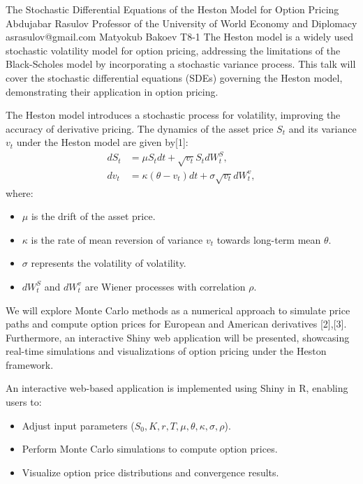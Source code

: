 \begin{talk}
  {The Stochastic Differential Equations of the Heston Model for Option Pricing}%
  {Abdujabar Rasulov}%
  {Professor of the University of World Economy and Diplomacy}%
  {asrasulov@gmail.com}%
  {Matyokub Bakoev}%
  {T8-1}%
The Heston model is a widely used stochastic volatility model for option pricing, addressing the limitations of the Black-Scholes model by incorporating a stochastic variance process. This talk will cover the stochastic differential equations (SDEs) governing the Heston model, demonstrating their application in option pricing. 

The Heston model introduces a stochastic process for volatility, improving the accuracy of derivative pricing. 
The dynamics of the asset price $S_t$ and its variance $v_t$ under the Heston model are given by[1]:
\begin{align}
    dS_t &= \mu S_t dt + \sqrt{v_t} S_t dW_t^S, \\
    dv_t &= \kappa(\theta - v_t) dt + \sigma \sqrt{v_t} dW_t^v,
\end{align}
where:
\begin{itemize}
    \item $\mu$ is the drift of the asset price.
    \item $\kappa$ is the rate of mean reversion of variance $v_t$ towards long-term mean $\theta$.
    \item $\sigma$ represents the volatility of volatility.
    \item $dW_t^S$ and $dW_t^v$ are Wiener processes with correlation $\rho$.
\end{itemize}

We will explore Monte Carlo methods as a numerical approach to simulate price paths and compute option prices for European and American derivatives [2],[3]. Furthermore, an interactive Shiny web application will be presented, showcasing real-time simulations and visualizations of option pricing under the Heston framework.

An interactive web-based application is implemented using Shiny in R, enabling users to:
\begin{itemize}
    \item Adjust input parameters ($S_0, K, r, T, \mu, \theta, \kappa, \sigma, \rho$).
    \item Perform Monte Carlo simulations to compute option prices.
    \item Visualize option price distributions and convergence results.
\end{itemize}


\end{talk}
